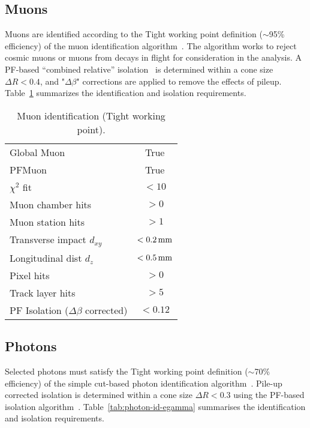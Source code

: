 \subsection{Muons\label{recMuon}}

Muons are identified according to the Tight working point definition
($\sim$95\% efficiency) of the muon identification
algorithm~\cite{ref:muon-id}. The algorithm works to reject cosmic muons or 
muons from decays in flight for consideration in the analysis. 
A PF-based ``combined relative'' isolation~\cite{ref:muon-id} is determined 
within a cone size $\Delta R < 0.4$, and "$\Delta\beta$" corrections 
are applied to remove the effects of pileup. Table~\ref{tab:muon-id} summarizes the
identification and isolation requirements. 

\begin{table}[h!]
  \caption{Muon identification (Tight working point).\label{tab:muon-id}}
  \centering
  \footnotesize
  \begin{tabular}{ lc }
    \hline
    \hline
    Global Muon                            & True      \\
    PFMuon                                 & True      \\
    $\chi^{2}$ fit                         & $<10$     \\
    Muon chamber hits                      & $>0$      \\
    Muon station hits                      & $>1$      \\
    Transverse impact $d_{xy}$             & $<0.2\,\text{mm}$ \\
    Longitudinal dist $d_{z}$              & $<0.5\,\text{mm}$ \\
    Pixel hits                             & $>0$      \\
    Track layer hits                       & $>5$      \\
    PF Isolation ($\Delta\beta$ corrected) & $<0.12$   \\
    \hline
    \hline
  \end{tabular}
\end{table}

\subsection{Photons\label{recPhot}}
%
Selected photons must satisfy the Tight working point definition 
($\sim$70\% efficiency) of the simple cut-based photon identification
algorithm~\cite{ref:photon-id-egamma}. Pile-up corrected isolation is 
determined within a cone size $\Delta R < 0.3$ using the PF-based 
isolation algorithm~\cite{ref:photon-id-egamma}. 
Table~\ref{tab:photon-id-egamma} summarises the identification
and isolation requirements. 

